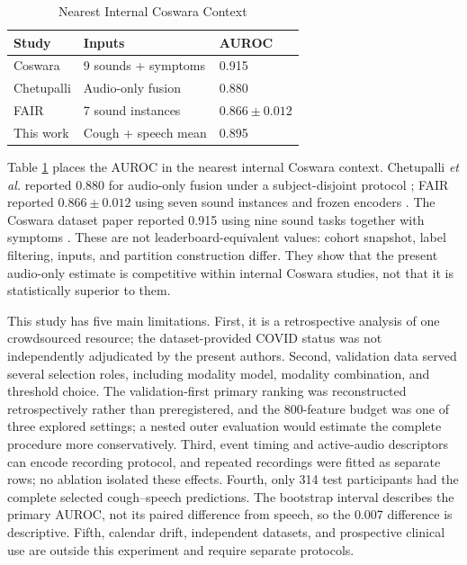\documentclass[conference]{IEEEtran}
\begin{document}
\begin{table}[H]
\caption{Nearest Internal Coswara Context}
\label{tab:context}
\centering
\footnotesize
\setlength{\tabcolsep}{3.1pt}
\begin{tabular}{lll}
\toprule
Study & Inputs & AUROC \\
\midrule
Coswara \cite{bhattacharya2023coswara} & 9 sounds + symptoms & 0.915 \\
Chetupalli \cite{chetupalli2023multimodal} & Audio-only fusion & 0.880 \\
FAIR \cite{truong2024fair} & 7 sound instances & $0.866\pm0.012$ \\
This work & Cough + speech mean & 0.895 \\
\bottomrule
\end{tabular}
\end{table}

Table \ref{tab:context} places the AUROC in the nearest internal Coswara
context. Chetupalli \emph{et al.} reported 0.880 for audio-only fusion under a
subject-disjoint protocol \cite{chetupalli2023multimodal}; FAIR reported
$0.866\pm0.012$ using seven sound instances and frozen encoders
\cite{truong2024fair}. The Coswara dataset paper reported 0.915 using nine
sound tasks together with symptoms \cite{bhattacharya2023coswara}. These are
not leaderboard-equivalent values: cohort snapshot, label filtering, inputs,
and partition construction differ. They show that the present audio-only
estimate is competitive within internal Coswara studies, not that it is
statistically superior to them.

This study has five main limitations. First, it is a retrospective analysis of
one crowdsourced resource; the dataset-provided COVID status was not
independently adjudicated by the present authors. Second, validation data served
several selection roles, including modality model, modality combination, and
threshold choice. The validation-first primary ranking was reconstructed
retrospectively rather than preregistered, and the 800-feature budget was one
of three explored settings;
a nested outer evaluation would estimate the complete procedure more
conservatively. Third, event timing and active-audio descriptors can encode
recording protocol, and repeated recordings were fitted as separate rows; no
ablation isolated these effects. Fourth, only 314 test participants had the
complete selected cough--speech predictions. The bootstrap interval describes
the primary AUROC, not its paired difference from speech, so the 0.007
difference is descriptive. Fifth, calendar drift, independent datasets, and
prospective clinical use are outside this experiment and require separate
protocols.
\end{document}
